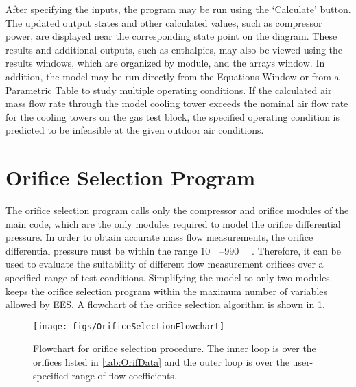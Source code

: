 After specifying the inputs, the program may be run using the `Calculate' button. 
The updated output states and other calculated values, such as compressor power,
are displayed near the corresponding state point on the diagram. 
These results and additional outputs, such as enthalpies, 
may also be viewed using the results windows, which are organized by module,
and the arrays window.
In addition, the model may be run directly from the Equations Window or
from a Parametric Table to study multiple operating conditions.
If the calculated air mass flow rate through the model cooling tower exceeds
the nominal air flow rate for the cooling towers on the gas test block,
the specified operating condition is predicted to be infeasible at the given
outdoor air conditions.

\section{Orifice Selection Program} \label{sec:OrifSelect}
The orifice selection program calls only the 
compressor and orifice modules of the main code,
which are the only modules required to model the orifice differential pressure.
In order to obtain accurate mass flow measurements, the orifice differential pressure
must be within the range \SIrange{10}{990}{\inch{}} \parencite{trevino2012}.
Therefore, it can be used to evaluate the suitability of 
different flow measurement orifices over a specified range of test conditions.
Simplifying the model to only two modules keeps the orifice selection program within the maximum
number of variables allowed by EES.
A flowchart of the orifice selection algorithm is shown in \cref{fig:FlowOrifSelect}.
\begin{figure}[tbp]
  \centering
  \texttt{[image: figs/OrificeSelectionFlowchart]}
  \caption{Flowchart for orifice selection procedure. 
    The inner loop is over the orifices listed in \cref{tab:OrifData}
    and the outer loop is over the user-specified range of flow coefficients.}
  \label{fig:FlowOrifSelect}
\end{figure}

